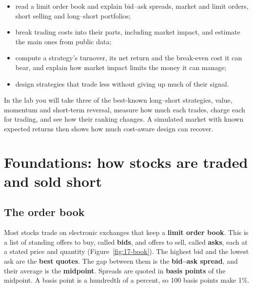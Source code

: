 \begin{itemize}
  \item read a limit order book and explain bid--ask spreads, market and limit orders, short selling and long--short portfolios;
  \item break trading costs into their parts, including market impact, and estimate the main ones from public data;
  \item compute a strategy's turnover, its net return and the break-even cost it can bear, and explain how market impact limits the money it can manage;
  \item design strategies that trade less without giving up much of their signal.
\end{itemize}


In the lab you will take three of the best-known long--short strategies, value, momentum and short-term reversal, measure how much each trades, charge each for trading, and see how their ranking changes. A simulated market with known expected returns then shows how much cost-aware design can recover.

\section{Foundations: how stocks are traded and sold short}
\label{sec:17-foundations}

\subsection{The order book}

Most stocks trade on electronic exchanges that keep a \textbf{limit order book}. This is a list of standing offers to buy, called \textbf{bids}, and offers to sell, called \textbf{asks}, each at a stated price and quantity (Figure~\ref{fig:17-book}). The highest bid and the lowest ask are the \textbf{best quotes}. The gap between them is the \textbf{bid--ask spread}, and their average is the \textbf{midpoint}. Spreads are quoted in \textbf{basis points} of the midpoint. A basis point is a hundredth of a percent, so 100 basis points make 1\%.

